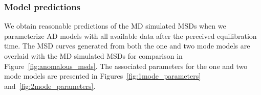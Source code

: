 \documentclass[journal=jctcce,manuscript=article]{achemso}
\begin{document}
  \subsubsection{Model predictions}\label{section:AD_all_data}
 
  We obtain reasonable predictions of the MD simulated MSDs when we
  parameterize AD models with all available data after the perceived
  equilibration time. The MSD curves generated from both the one and 
  two mode models are overlaid with the MD simulated MSDs for comparison in
  Figure~\ref{fig:anomalous_msds}. The associated parameters for the one and two
  mode models are presented in Figures~\ref{fig:1mode_parameters}
  and~\ref{fig:2mode_parameters}.
  
\end{document}
